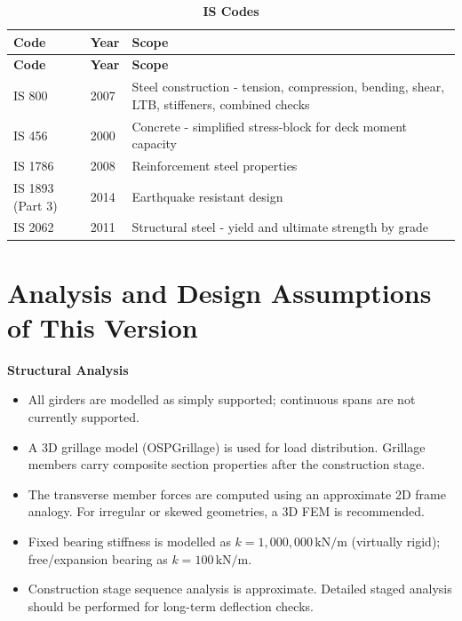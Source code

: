 \documentclass[12pt,a4paper]{report}
\numberwithin{table}{chapter}
\numberwithin{figure}{chapter}
\newcommand{\ReportTableSetup}{%
  \setlength{\tabcolsep}{3.0pt}%
  \renewcommand{\arraystretch}{1.18}%
  \setlength{\arrayrulewidth}{0.4pt}\setlength{\extrarowheight}{0.5pt}%
  \setlength{\LTleft}{\fill}\setlength{\LTright}{\fill}%
  \setlength{\LTpre}{4pt}\setlength{\LTpost}{8pt}}
\newcommand{\ReportTableFont}{\small}
\begin{document}
\begingroup
\ReportTableSetup
\ReportTableFont
\begin{longtable}{|C{1.9131cm}|C{1.9131cm}|p{12.4350cm}|}

\caption{\textbf{IS Codes}}\\

\hline
\textbf{Code} & \textbf{Year} & \textbf{Scope} \\
\hline
\endfirsthead
\hline
\textbf{Code} & \textbf{Year} & \textbf{Scope} \\
\hline
\endhead
\hline
\endfoot
\hline
\endlastfoot

IS 800 & 2007 & Steel construction - tension, compression, bending, shear, LTB, stiffeners, combined checks \\
\hline
IS 456 & 2000 & Concrete - simplified stress-block for deck moment capacity \\
\hline
IS 1786 & 2008 & Reinforcement steel properties \\
\hline
IS 1893 (Part 3) & 2014 & Earthquake resistant design \\
\hline
IS 2062 & 2011 & Structural steel - yield and ultimate strength by grade \\
\hline
\end{longtable}
\endgroup


\section{Analysis and Design Assumptions of This Version}
\label{sec:design-assumptions}

\textbf{Structural Analysis}

\begin{itemize}
    \item All girders are modelled as simply supported; continuous spans are not currently supported.
    \item A 3D grillage model (OSPGrillage) is used for load distribution. Grillage members carry composite section properties after the construction stage.
    \item The transverse member forces are computed using an approximate 2D frame analogy. For irregular or skewed geometries, a 3D FEM is recommended.
    \item Fixed bearing stiffness is modelled as $k = 1{,}000{,}000 \,\text{kN/m}$ (virtually rigid); free/expansion bearing as $k = 100 \, \text{kN/m}$.
    \item Construction stage sequence analysis is approximate. Detailed staged analysis should be performed for long-term deflection checks.
\end{itemize}
\end{document}
